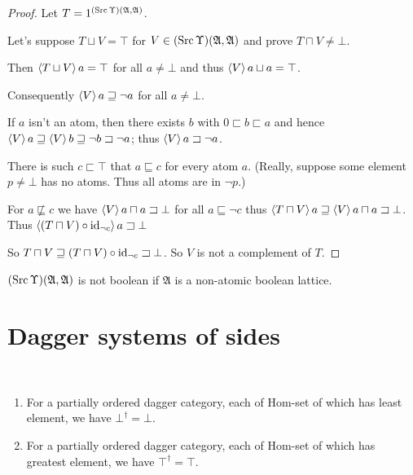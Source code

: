 \begin{proof}
  Let $T = 1^{(\operatorname{Src}\Upsilon)(\mathfrak{A}, \mathfrak{A})}$.
  
  Let's suppose $T \sqcup V = \top$ for $V \in (\operatorname{Src}\Upsilon) (\mathfrak{A},
  \mathfrak{A})$ and prove $T \sqcap V \neq \bot$.
  
  Then $\left\langle T \sqcup V\right\rangle a = \top$ for all $a \neq \bot$ and thus $\left\langle V\right\rangle
  a \sqcup a = \top$.
  
  Consequently $\left\langle V\right\rangle a \sqsupseteq \neg a$ for all $a \neq \bot$.
  
  If $a$ isn't an atom, then there exists $b$ with $0 \sqsubset b \sqsubset a$
  and hence $\left\langle V\right\rangle a \sqsupseteq \left\langle V\right\rangle b \sqsupseteq \neg b \sqsupset \neg a$;
  thus $\left\langle V\right\rangle a \sqsupset \neg a$.
  
  There is such $c\sqsubset\top$ that $a \sqsubseteq c$ for every atom $a$. (Really,
  suppose some element $p \neq \bot$ has no atoms. Thus all atoms are in $\neg
  p$.)
  
  For $a \nsqsubseteq c$ we have $\left\langle V\right\rangle a \sqcap a \sqsupset \bot$
  for all $a \sqsubseteq \neg c$ thus $\left\langle T \sqcap V\right\rangle a \sqsupseteq
  \left\langle V\right\rangle a \sqcap a \sqsupset \bot$. Thus $\left\langle (T \sqcap V) \circ
  \operatorname{id}_{\neg c}\right\rangle a \sqsupset \bot$
  
  So $T \sqcap V \sqsupseteq (T \sqcap V) \circ \operatorname{id}_{\neg c} \sqsupset
  \bot$. So $V$ is not a complement of $T$.
\end{proof}

\begin{cor}
  $(\operatorname{Src}\Upsilon)(\mathfrak{A}, \mathfrak{A})$ is not boolean if $\mathfrak{A}$
  is a non-atomic boolean lattice.
\end{cor}

\section{Dagger systems of sides}

\begin{prop}
~
\begin{enumerate}
\item For a partially ordered dagger category, each of Hom-set of which has least element, we have $\bot^\dagger = \bot$.
\item For a partially ordered dagger category, each of Hom-set of which has greatest element, we have $\top^\dagger = \top$.
\end{enumerate}
\end{prop}

